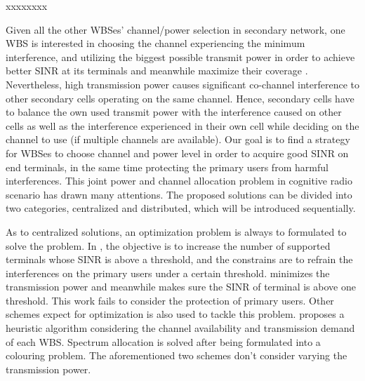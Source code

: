 xxxxxxxx

Given all the other WBSes' channel/power selection in secondary network, one WBS is interested in choosing the channel experiencing the minimum interference, and utilizing the biggest possible transmit power in order to achieve better SINR at its terminals and meanwhile maximize their coverage \cite{wuinfocom09, HoangPowerChannel2010}. 
Nevertheless, high transmission power causes significant co-channel interference to other secondary cells operating on the same channel. 
Hence, secondary cells have to balance the own used transmit power with the interference caused on other cells as well as the interference experienced in their own cell while deciding on the channel to use (if multiple channels are available). 
Our goal is to find a strategy for WBSes to choose channel and power level in order to acquire good SINR on end terminals, in the same time protecting the primary users from harmful interferences.
This joint power and channel allocation problem in cognitive radio scenario has drawn many attentions.
The proposed solutions can be divided into two categories, centralized and distributed, which will be introduced sequentially.

As to centralized solutions, an optimization problem is always to formulated to solve the problem.
In \cite{downlink-centralized-08-TWC}, the objective is to increase the number of supported terminals whose SINR is above a threshold, and the constrains are to refrain the interferences on the primary users under a certain threshold.
\cite{joint_power_channel_linkpair_08ICT} minimizes the transmission power and meanwhile makes sure the SINR of terminal is above one threshold.
This work fails to consider the protection of primary users.
Other schemes expect for optimization is also used to tackle this problem.
\cite{centralized_80222_sharing_ifip2011} proposes a heuristic algorithm considering the channel availability and transmission demand of each WBS.
Spectrum allocation is solved after being formulated into a colouring problem.
The aforementioned two schemes don't consider varying the transmission power.

